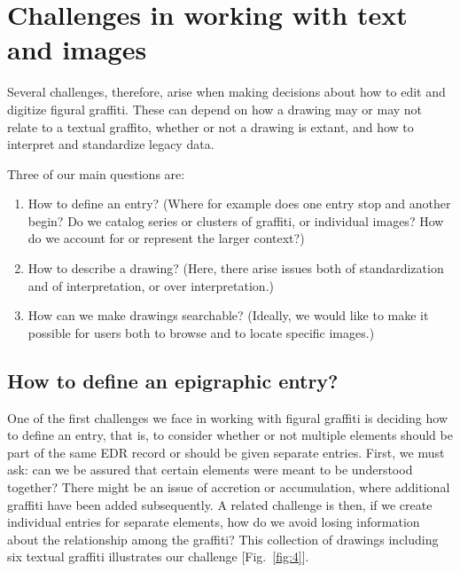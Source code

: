 \documentclass[amsthm,ebook]{saparticle}
\begin{document}
\section{Challenges in working with text and images}


Several challenges, therefore, arise when making decisions about how to edit and digitize figural graffiti. These can
depend on how a drawing may or may not relate to a textual graffito, whether or not a drawing is extant, and how to
interpret and standardize legacy data. 




Three of our main questions are:

\begin{enumerate}
\item How to define an entry? (Where for example does one entry stop and another begin? Do we catalog series or clusters
of graffiti, or individual images? How do we account for or represent the larger context?)
\item How to describe a drawing? (Here, there arise issues both of standardization and of interpretation, or over
interpretation.)
\item How can we make drawings searchable? (Ideally, we would like to make it possible for users both to browse and to
locate specific images.)
\end{enumerate}



\subsection{How to define an epigraphic entry?}
 

One of the first challenges we face in working with figural graffiti is deciding how to define an entry, that is, to
consider whether or not multiple elements should be part of the same EDR record or should be given separate entries.
First, we must ask: can we be assured that certain elements were meant to be understood together? There might be an
issue of accretion or accumulation, where additional graffiti have been added subsequently. A related challenge is
then, if we create individual entries for separate elements, how do we avoid losing information about the relationship
among the graffiti? This collection of drawings including six textual graffiti illustrates our challenge [Fig.~\ref{fig:4}].
\end{document}
